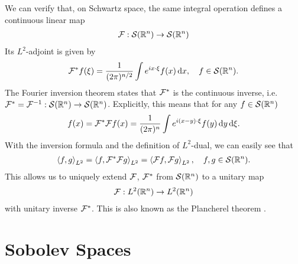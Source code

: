 \documentclass[12pt]{article}
\begin{document}
We can verify that, on Schwartz space, the same integral operation defines a continuous linear map 
\begin{align*}
\F : \sch(\R^n) \to \sch(\R^n)
\end{align*}
Its $L^2$-adjoint is given by 
\begin{align*}
\F^* f(\xi) = \frac{1}{(2\pi)^{n/2}} \int e^{i x \cdot \xi} f(x)\d[x], \quad f \in \sch(\R^n). 
\end{align*}
The Fourier inversion theorem states that $\F^* $ is the continuous inverse, i.e. $\F^* = \F^{-1} : \sch(\R^n) \to \sch(\R^n)$. Explicitly, this means that for any $f \in \sch(\R^n)$ 
\begin{align*}
f(x) = \F^* \F f (x) = \frac{1}{(2\pi)^n} \int e^{i(x - y) \cdot \xi} f(y) \d[y] \d[\xi]. 
\end{align*}
With the inversion formula and the definition of $L^2$-dual, we can easily see that 
\begin{align*}
\inprod[f, g]_{L^2} = \inprod[f, \F^* \F g]_{L^2} = \inprod[\F f, \F g]_{L^2}, \quad f, g \in \sch(\R^n). 
\end{align*}
This allows us to uniquely extend $\F$, $\F^*$ from $\sch(\R^n)$ to a unitary map 
\begin{align*}
\F : L^2(\R^n) \to L^2(\R^n)
\end{align*}
with unitary  inverse $\F^*$. This is also known as the Plancherel theorem \cite{}. 



\section{Sobolev Spaces }
\cite[Chapter 4]{taylor_pde}
\end{document}

